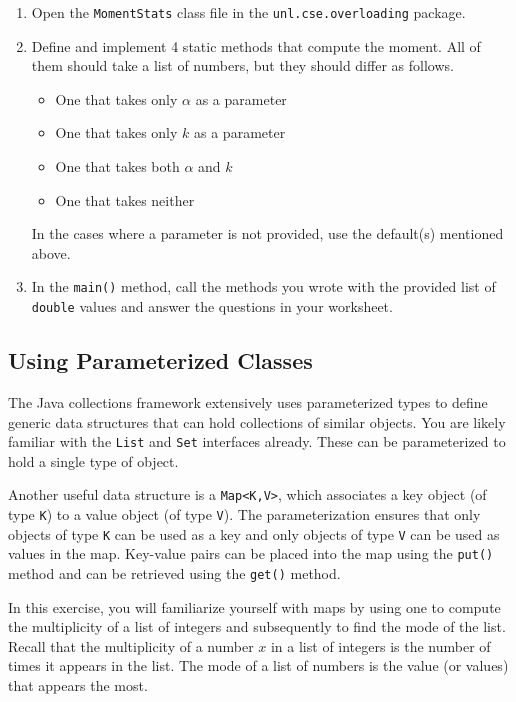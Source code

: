 \documentclass[12pt]{scrartcl}
\begin{document}
\begin{enumerate}
  \item Open the \texttt{MomentStats} class file in 
	the \texttt{unl.cse.overloading} package.
  \item Define and implement 4 static methods that compute the
    moment.  All of them should 
	take a list of numbers, but they should differ as follows.
	\begin{itemize}
	  \item One that takes only $\alpha$ as a parameter
	  \item One that takes only $k$ as a parameter
	  \item One that takes both $\alpha$ and $k$
	  \item One that takes neither
	\end{itemize}
	In the cases where a parameter is not provided, use the 
	default(s) mentioned above.
  \item In the \texttt{main()} method, call the methods
  	you wrote with the provided list of \texttt{double} 
	values and answer the questions in your worksheet.
\end{enumerate}
	
\subsection*{Using Parameterized Classes}

The Java collections framework extensively uses parameterized types 
to define generic data structures that can hold collections of 
similar objects.  You are likely familiar with the \texttt{List} 
and \texttt{Set} interfaces already.  These can be 
parameterized to hold a single type of object.

Another useful data structure is a \texttt{Map<K,V>}, which 
associates a key object (of type \texttt{K}) to a value 
object (of type \texttt{V}).  The parameterization ensures 
that only objects of type \texttt{K} can be used as a key 
and only objects of type \texttt{V} can be used as values 
in the map.  Key-value pairs can be placed into the map using the 
\texttt{put()} method and can be retrieved using the 
\texttt{get()} method.  

In this exercise, you will familiarize yourself with maps by using one 
to compute the multiplicity of a list of integers and subsequently 
to find the mode of the list.  Recall that the multiplicity of a 
number $x$ in a list of integers is the number of times it appears 
in the list.  The mode of a list of numbers is the value (or values) 
that appears the most.
\end{document}
